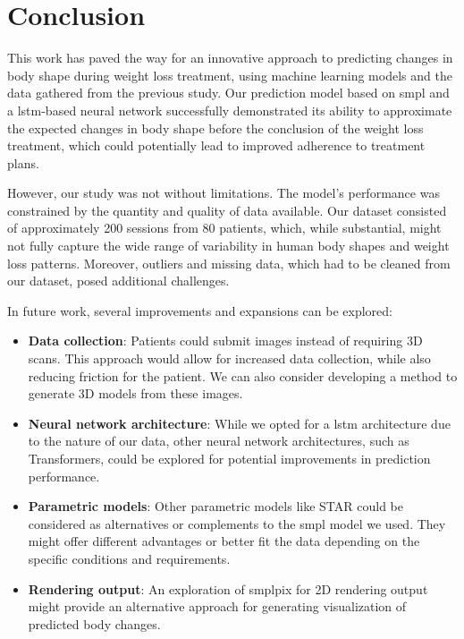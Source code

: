 
\chapter{Conclusion}\label{conclusion}

This work has paved the way for an innovative approach to predicting changes in
body shape during weight loss treatment, using machine learning models and the
data gathered from the previous study. Our prediction model based on \gls{smpl}
and a \gls{lstm}-based neural network successfully demonstrated its ability to
approximate the expected changes in body shape before the conclusion of the
weight loss treatment, which could potentially lead to improved adherence to
treatment plans.

However, our study was not without limitations. The model's performance was
constrained by the quantity and quality of data available. Our dataset
consisted of approximately 200 sessions from 80 patients, which, while
substantial, might not fully capture the wide range of variability in human
body shapes and weight loss patterns. Moreover, outliers and missing data,
which had to be cleaned from our dataset, posed additional challenges.

In future work, several improvements and expansions can be explored:

\begin{itemize}
    \item \textbf{Data collection}: Patients could submit images instead of requiring 3D scans. This approach would allow for increased data collection, while also reducing friction for the patient. We can also consider developing a method to generate 3D models from these images.
    \item \textbf{Neural network architecture}: While we opted for a \gls{lstm}
          architecture due to the nature of our data, other neural network architectures,
          such as Transformers, could be explored for potential improvements in
          prediction performance.
    \item \textbf{Parametric models}: Other parametric models like STAR could
          be considered as alternatives or complements to the \gls{smpl}
          model we used. They might offer different advantages or better fit
          the data depending on the specific conditions and requirements.

    \item \textbf{Rendering output}: An exploration of smplpix for 2D
          rendering output might provide an alternative approach for generating
          visualization of predicted body changes.
\end{itemize}